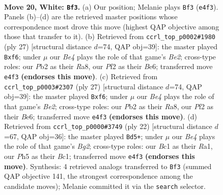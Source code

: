 \documentclass[11pt]{article}
\begin{document}
\clearpage

\begin{figure}[p]\centering
\begin{subfigure}{0.46\textwidth}\centering
\resizebox{\linewidth}{!}{%
\newchessgame
\chessboard[
  setfen={nrbr2k1/p3qpbp/8/1pp1pn1P/4B3/3PP3/PP3P2/RNBQNRK1 w - - 6 20},
  showmover=false,
  pgfstyle=straightmove, color=movearrow, markmove={e4-f3}
]}
\caption{}
\end{subfigure}\hfill
\begin{subfigure}{0.46\textwidth}\centering
\resizebox{\linewidth}{!}{%
\newchessgame
\chessboard[
  setfen={rn1q1rk1/4bpp1/3pbN1p/p3p3/Pp2P3/8/1PP1BPPP/R1BQRNK1 b - - 0 14},
  showmover=false,
  pgfstyle=straightmove, color=movearrow, markmove={e7-f6}
]}
\caption{}
\end{subfigure}
\\[4pt]
\begin{subfigure}{0.46\textwidth}\centering
\resizebox{\linewidth}{!}{%
\newchessgame
\chessboard[
  setfen={rn1q1rk1/4bpp1/3pbN1p/p3p3/Pp2P3/8/1PP1BPPP/R1BQRNK1 b - - 0 14},
  showmover=false,
  pgfstyle=straightmove, color=movearrow, markmove={e7-f6}
]}
\caption{}
\end{subfigure}\hfill
\begin{subfigure}{0.46\textwidth}\centering
\resizebox{\linewidth}{!}{%
\newchessgame
\chessboard[
  setfen={r1b1qrk1/ppp3pp/2np4/5p1n/2PP4/2PQ3N/P3PPB1/R1B1K2R w KQ - 0 12},
  showmover=false,
  pgfstyle=straightmove, color=movearrow, markmove={g2-d5}
]}
\caption{}
\end{subfigure}
\caption{\textbf{Move 20, White: \texttt{Bf3}.} (a) Our position; Melanie plays \texttt{Bf3} (\texttt{e4f3}). Panels (b)--(d) are the retrieved master positions whose correspondence most drove this move (highest QAP objective among those that transfer to it). (b) Retrieved from \texttt{ccrl\_top\_p0002\#1980} (ply 27) [structural distance $d$=74, QAP obj=39]: the master played \texttt{Bxf6}; under $\mu$ our \emph{Be4} plays the role of that game's \emph{Be2}; cross-type roles: our \emph{P}b2 as their \emph{R}a8, our \emph{P}f2 as their \emph{B}e6; transferred move \texttt{e4f3} \textbf{(endorses this move)}. (c) Retrieved from \texttt{ccrl\_top\_p0003\#2307} (ply 27) [structural distance $d$=74, QAP obj=39]: the master played \texttt{Bxf6}; under $\mu$ our \emph{Be4} plays the role of that game's \emph{Be2}; cross-type roles: our \emph{P}b2 as their \emph{R}a8, our \emph{P}f2 as their \emph{B}e6; transferred move \texttt{e4f3} \textbf{(endorses this move)}. (d) Retrieved from \texttt{ccrl\_top\_p0000\#3749} (ply 22) [structural distance $d$=67, QAP obj=36]: the master played \texttt{Bd5+}; under $\mu$ our \emph{Be4} plays the role of that game's \emph{Bg2}; cross-type roles: our \emph{B}c1 as their \emph{R}a1, our \emph{P}h5 as their \emph{B}c1; transferred move \texttt{e4f3} \textbf{(endorses this move)}. Synthesis: 4 retrieved analogs transferred to \texttt{Bf3} (summed QAP objective 141, the strongest correspondence among the candidate moves); Melanie committed it via the \texttt{search} selector.}
\label{fig:thought-m38}
\end{figure}
\end{document}
